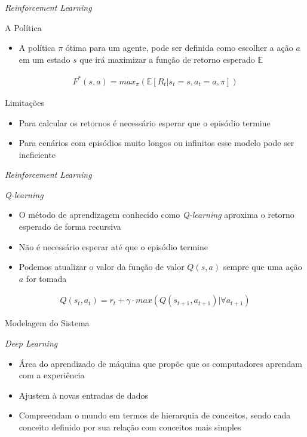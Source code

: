 \documentclass[aspectratio=169]{beamer}
\begin{document}
\begin{frame}{\textit{Reinforcement Learning}}
	\begin{block}{A Política}
		\begin{itemize}
			\item A política $\pi$ ótima para um agente, pode ser definida como escolher a ação $a$ em um estado $s$ que irá maximizar a função de retorno esperado $\mathbb{E}$
		\end{itemize}
	\end{block}
	\begin{eqnarray}
		F^*(s,a) = max_\pi(\mathbb{E}[R_t | s_t=s,a_t=a,\pi])
	\end{eqnarray}
	\pause
	\begin{block}{Limitações}
		\begin{itemize}
			\item Para calcular os retornos é necessário esperar que o episódio termine
			\item Para cenários com episódios muito longos ou infinitos esse modelo pode ser ineficiente
		\end{itemize}
	\end{block}
\end{frame}

\begin{frame}{\textit{Reinforcement Learning}}
	\begin{block}{\textit{Q-learning}}
		\begin{itemize}
			\item O método de aprendizagem conhecido como \textit{Q-learning} aproxima o retorno esperado de forma recursiva
			\item Não é necessário esperar até que o episódio termine
			\item Podemos atualizar o valor da função de valor $Q(s,a)$ sempre que uma ação $a$ for tomada
		\end{itemize}
	\end{block}
	\begin{eqnarray}
		Q(s_t, a_t)= r_t + \gamma \cdot max(Q(s_{t+1},a_{t+1})|\forall a_{t+1})
	  \label{eq:q_fun}
	\end{eqnarray}
\end{frame}

\begin{frame}{Modelagem do Sistema}
	\begin{block}{\textit{Deep Learning}}
		\begin{itemize}
			\item Área do aprendizado de máquina que propõe que os computadores aprendam com a experiência
			\item Ajustem à novas entradas de dados
			\item Compreendam o mundo em termos de hierarquia de conceitos, sendo cada conceito definido por sua relação com conceitos mais simples
		\end{itemize}
	\end{block}
\end{frame}
\end{document}
